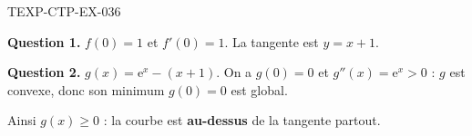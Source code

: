 \begin{corrige}{TEXP-CTP-EX-036}

\textbf{Question 1.} $f(0) = 1$ et $f'(0) = 1$. La tangente est $y = x + 1$.


\textbf{Question 2.} $g(x) = \mathrm{e}^x - (x+1)$. On a $g(0)=0$ et $g''(x) = \mathrm{e}^x > 0$ : $g$ est convexe, donc son minimum $g(0)=0$ est global.

Ainsi $g(x) \geq 0$ : la courbe est \textbf{au-dessus} de la tangente partout.

\end{corrige}

